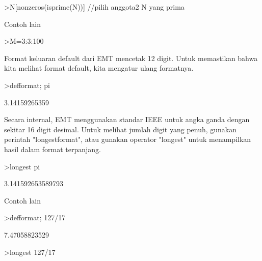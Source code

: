 \documentclass[12pt,arial,letterpaper]{book}
\begin{document}
\begin{eulerprompt}
>N[nonzeros(isprime(N))] //pilih anggota2 N yang prima
\end{eulerprompt}
\begin{euleroutput}
  [2,  3,  5,  7,  11,  13,  17,  19,  23,  29,  31,  37,  41,  43,  47,
  53,  59,  61,  67,  71,  73,  79,  83,  89,  97]
\end{euleroutput}
\begin{eulercomment}
Contoh lain
\end{eulercomment}
\begin{eulerprompt}
>M=3:3:100
\end{eulerprompt}
\begin{euleroutput}
  [3,  6,  9,  12,  15,  18,  21,  24,  27,  30,  33,  36,  39,  42,  45,
  48,  51,  54,  57,  60,  63,  66,  69,  72,  75,  78,  81,  84,  87,
  90,  93,  96,  99]
\end{euleroutput}
\begin{eulercomment}
Format keluaran default dari EMT mencetak 12 digit. Untuk memastikan
bahwa kita melihat format default, kita mengatur ulang formatnya.
\end{eulercomment}
\begin{eulerprompt}
>defformat; pi
\end{eulerprompt}
\begin{euleroutput}
  3.14159265359
\end{euleroutput}
\begin{eulercomment}
Secara internal, EMT menggunakan standar IEEE untuk angka ganda dengan
sekitar 16 digit desimal. Untuk melihat jumlah digit yang penuh,
gunakan perintah "longestformat", atau gunakan operator "longest"
untuk menampilkan hasil dalam format terpanjang.
\end{eulercomment}
\begin{eulerprompt}
>longest pi
\end{eulerprompt}
\begin{euleroutput}
        3.141592653589793 
\end{euleroutput}
\begin{eulercomment}
Contoh lain
\end{eulercomment}
\begin{eulerprompt}
>defformat; 127/17
\end{eulerprompt}
\begin{euleroutput}
  7.47058823529
\end{euleroutput}
\begin{eulerprompt}
>longest 127/17
\end{eulerprompt}
\end{document}
